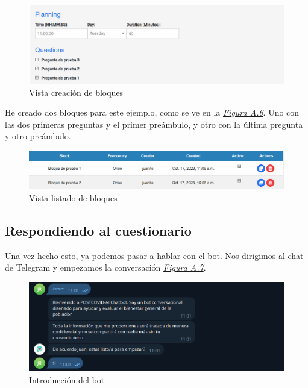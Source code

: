 \begin{figure}[!ht]
    \centering
    \includegraphics[width=1\textwidth]{imagenes/creacion_bloque2.png}
    \caption{ Vista creación de bloques }
    \label{fig:creacion-bloques}
\end{figure}\vspace{0.5cm}

He creado dos bloques para este ejemplo, como se ve en la \textit{\hyperref[fig:contextos-creados]{Figura A.6}}. Uno con las dos primeras preguntas y el primer preámbulo, y otro con la última pregunta y otro preámbulo.  

\begin{figure}[!ht]
    \centering
    \includegraphics[width=1\textwidth]{imagenes/bloques_prueba.png}
    \caption{ Vista listado de bloques }
    \label{fig:creacion_contexto}
\end{figure}


\subsection{Respondiendo al cuestionario}

Una vez hecho esto, ya podemos pasar a hablar con el bot. Nos dirigimos al chat de Telegram y empezamos la conversación \textit{\hyperref[fig:cuestionario1]{Figura A.7}}.

\begin{figure}[!ht]
    \centering
    \includegraphics[width=1\textwidth]{imagenes/bot1.png}
    \caption{ Introducción del bot }
    \label{fig:cuestionario1}
\end{figure}\vspace{0.5cm}

